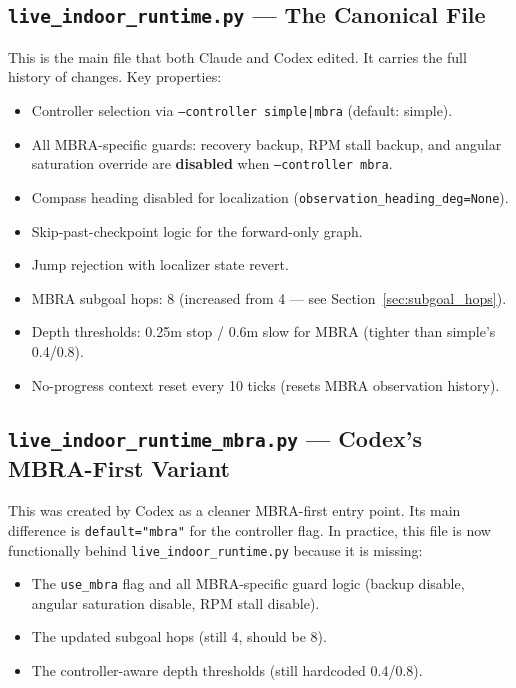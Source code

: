 \documentclass[11pt]{article}
\begin{document}
\subsection{\texttt{live\_indoor\_runtime.py} --- The Canonical File}

This is the main file that both Claude and Codex edited. It carries the full history of changes. Key properties:
\begin{itemize}
\item Controller selection via \texttt{--controller simple|mbra} (default: simple).
\item All MBRA-specific guards: recovery backup, RPM stall backup, and angular saturation override are \textbf{disabled} when \texttt{--controller mbra}.
\item Compass heading disabled for localization (\texttt{observation\_heading\_deg=None}).
\item Skip-past-checkpoint logic for the forward-only graph.
\item Jump rejection with localizer state revert.
\item MBRA subgoal hops: 8 (increased from 4 --- see Section~\ref{sec:subgoal_hops}).
\item Depth thresholds: 0.25m stop / 0.6m slow for MBRA (tighter than simple's 0.4/0.8).
\item No-progress context reset every 10 ticks (resets MBRA observation history).
\end{itemize}

\subsection{\texttt{live\_indoor\_runtime\_mbra.py} --- Codex's MBRA-First Variant}

This was created by Codex as a cleaner MBRA-first entry point. Its main difference is \texttt{default="mbra"} for the controller flag. In practice, this file is now functionally behind \texttt{live\_indoor\_runtime.py} because it is missing:
\begin{itemize}
\item The \texttt{use\_mbra} flag and all MBRA-specific guard logic (backup disable, angular saturation disable, RPM stall disable).
\item The updated subgoal hops (still 4, should be 8).
\item The controller-aware depth thresholds (still hardcoded 0.4/0.8).
\end{itemize}
\end{document}
